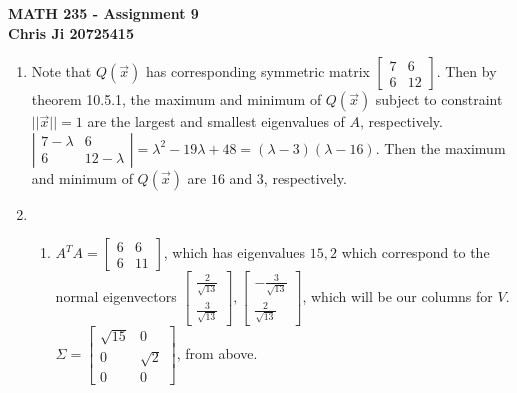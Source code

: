 \documentclass[10pt,english]{article}
\begin{document}
\noindent \begin{center}
\textbf{\large{}MATH 235 - Assignment 9}\\
\textbf{\large{}Chris Ji 20725415}
\par\end{center}{\large \par}
\medskip{}

\begin{enumerate}
    \item Note that $Q(\vec{x})$ has corresponding symmetric matrix $\begin{bmatrix}7&6\\6&12\end{bmatrix}$. Then by theorem 10.5.1, the maximum and minimum of $Q(\vec{x})$ subject to constraint $||\vec{x}||=1$ are the largest and smallest eigenvalues of $A$, respectively. $\left|\begin{matrix}7-\lambda&6\\6&12-\lambda\end{matrix}\right|=\lambda^2-19\lambda+48=(\lambda-3)(\lambda-16)$. Then the maximum and minimum of $Q(\vec{x})$ are $16$ and $3$, respectively.
    
    \pagebreak
    \item \begin{enumerate}
        \item $A^TA=\begin{bmatrix}6&6\\6&11\end{bmatrix}$, which has eigenvalues $15,2$ which correspond to the normal eigenvectors $\begin{bmatrix}\frac{2}{\sqrt{13}}\\\frac{3}{\sqrt{13}}\end{bmatrix},\begin{bmatrix}-\frac{3}{\sqrt{13}}\\\frac{2}{\sqrt{13}}\end{bmatrix}$, which will be our columns for $V$. \\ 
        $\Sigma=\begin{bmatrix}\sqrt{15}&0\\0&\sqrt{2}\\0&0\end{bmatrix}$, from above.\\
        

\end{enumerate}
\end{enumerate}
\end{document}

